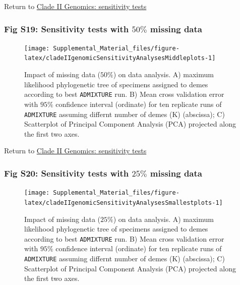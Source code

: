 \documentclass[
  11pt,
]{article}
\begin{document}
Return to \protect\hyperlink{sensitivity-tests-1}{Clade II Genomics: sensitivity tests}
\pagebreak

\hypertarget{fig-s19-sensitivity-tests-with-50-missing-data}{%
\subsubsection{\texorpdfstring{Fig S19: Sensitivity tests with \(50\%\) missing data}{Fig S19: Sensitivity tests with 50\textbackslash\% missing data}}\label{fig-s19-sensitivity-tests-with-50-missing-data}}

\begin{figure}
\texttt{[image: Supplemental\_Material\_files/figure-latex/cladeIIgenomicSensitivityAnalysesMiddleplots-1]} \caption{Impact of missing data ($50\%$) on data analysis. A) maximum likelihood phylogenetic tree of specimens assigned to demes according to best \texttt{ADMIXTURE} run. B) Mean cross validation error with $95\%$ confidence interval (ordinate) for ten replicate runs of \texttt{ADMIXTURE} assuming differnt number of demes (K) (abscissa); C) Scatterplot of Principal Component Analysis (PCA) projected along the first two axes.}\label{fig:cladeIIgenomicSensitivityAnalysesMiddleplots}
\end{figure}

Return to \protect\hyperlink{sensitivity-tests-1}{Clade II Genomics: sensitivity tests}
\pagebreak

\hypertarget{fig-s20-sensitivity-tests-with-25-missing-data}{%
\subsubsection{\texorpdfstring{Fig S20: Sensitivity tests with \(25\%\) missing data}{Fig S20: Sensitivity tests with 25\textbackslash\% missing data}}\label{fig-s20-sensitivity-tests-with-25-missing-data}}

\begin{figure}
\texttt{[image: Supplemental\_Material\_files/figure-latex/cladeIIgenomicSensitivityAnalysesSmallestplots-1]} \caption{Impact of missing data ($25\%$) on data analysis. A) maximum likelihood phylogenetic tree of specimens assigned to demes according to best \texttt{ADMIXTURE} run. B) Mean cross validation error with $95\%$ confidence interval (ordinate) for ten replicate runs of \texttt{ADMIXTURE} assuming differnt number of demes (K) (abscissa); C) Scatterplot of Principal Component Analysis (PCA) projected along the first two axes.}\label{fig:cladeIIgenomicSensitivityAnalysesSmallestplots}
\end{figure}
\end{document}
